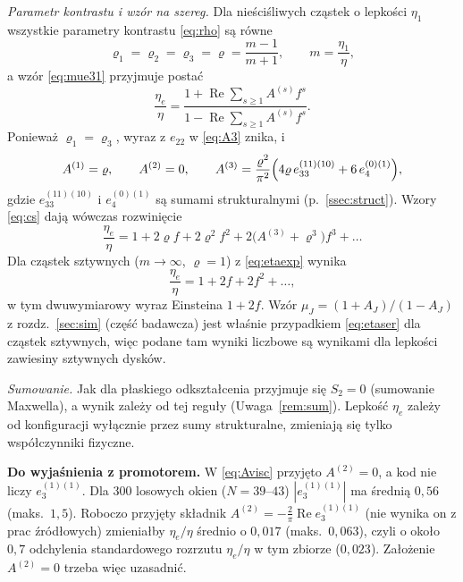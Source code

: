 \documentclass[12pt,a4paper,twoside,openright]{report}
\theoremstyle{definition}
\theoremstyle{remark}
\newcommand{\czer}[1]{{\color{red}#1}}
\renewcommand{\Re}{\operatorname{Re}}
\begin{document}
\emph{Parametr kontrastu i wzór na szereg.} Dla nieściśliwych cząstek o lepkości $\eta_1$ wszystkie parametry kontrastu \eqref{eq:rho} są równe
\begin{equation}\label{eq:varrho}
{\varrho_1=\varrho_2=\varrho_3=\varrho=\frac{m-1}{m+1},\qquad m=\frac{\eta_1}{\eta},}
\end{equation}
a wzór \eqref{eq:mue31} przyjmuje postać
\begin{equation}\label{eq:etaser}
{\frac{\eta_e}{\eta}=\frac{1+\Re\sum_{s\ge1}A^{(s)}f^s}{1-\Re\sum_{s\ge1}A^{(s)}f^s}.}
\end{equation}
Ponieważ $\varrho_1=\varrho_3$, wyraz z $e_{22}$ w \eqref{eq:A3} znika, i
\begin{equation}\label{eq:Avisc}
{A^{(1)}=\varrho,\qquad A^{(2)}=0,\qquad A^{(3)}=\frac{\varrho^2}{\pi^2}\Bigl(4\varrho\,e_{33}^{(11)(10)}+6\,e_4^{(0)(1)}\Bigr),}
\end{equation}
gdzie $e_{33}^{(11)(10)}$ i $e_4^{(0)(1)}$ są sumami strukturalnymi (p.~\ref{ssec:struct}). Wzory \eqref{eq:cs} dają wówczas rozwinięcie
\begin{equation}\label{eq:etaexp}
{\frac{\eta_e}{\eta}=1+2\varrho f+2\varrho^2f^2+2\bigl(A^{(3)}+\varrho^3\bigr)f^3+\dots}
\end{equation}
Dla cząstek sztywnych ($m\to\infty$, $\varrho=1$) z \eqref{eq:etaexp} wynika
\begin{equation}\label{eq:etarigid}
{\frac{\eta_e}{\eta}=1+2f+2f^2+\dots,}
\end{equation}
w tym dwuwymiarowy wyraz Einsteina $1+2f$. Wzór $\mu_J=(1+A_J)/(1-A_J)$ z rozdz.~\ref{sec:sim} (część badawcza) jest właśnie przypadkiem \eqref{eq:etaser} dla cząstek sztywnych, więc podane tam wyniki liczbowe są wynikami dla lepkości zawiesiny sztywnych dysków.

\emph{Sumowanie.} Jak dla płaskiego odkształcenia przyjmuje się $S_2=0$ (sumowanie Maxwella), a wynik zależy od tej reguły (Uwaga~\ref{rem:sum}). Lepkość $\eta_e$ zależy od konfiguracji wyłącznie przez sumy strukturalne, zmieniają się tylko współczynniki fizyczne.

\czer{\textbf{Do wyjaśnienia z promotorem.} W \eqref{eq:Avisc} przyjęto $A^{(2)}=0$, a kod nie liczy $e_3^{(1)(1)}$. Dla 300 losowych okien ($N=39$--$43$) $|e_3^{(1)(1)}|$ ma średnią $0{,}56$ (maks.\ $1{,}5$). Roboczo przyjęty składnik $A^{(2)}=-\frac2\pi\Re e_3^{(1)(1)}$ (nie wynika on z prac źródłowych) zmieniałby $\eta_e/\eta$ średnio o $0{,}017$ (maks.\ $0{,}063$), czyli o około $0{,}7$ odchylenia standardowego rozrzutu $\eta_e/\eta$ w tym zbiorze ($0{,}023$). Założenie $A^{(2)}=0$ trzeba więc uzasadnić.}
\end{document}
